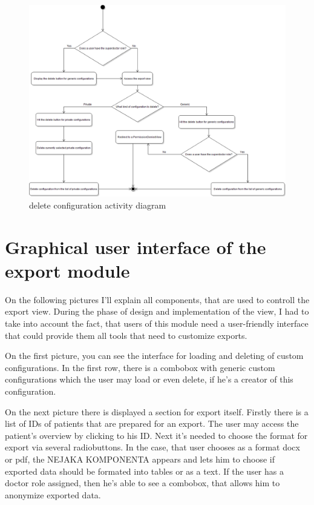 \documentclass[thesis=B,english]{FITthesis}[2012/10/20]
\begin{document}
\begin{figure}\centering
\includegraphics[width=0.7\paperwidth]{deleteConfigurationDiagram}
		\caption{delete configuration activity diagram}
\end{figure}



\section{Graphical user interface of the export module}
On the following pictures I'll explain all components, that are used to controll the export view. During the phase of design and implementation of the view, I had to take into account the fact, that users of this module need a user-friendly interface that could provide them all tools that need to customize exports.

On the first picture, you can see the interface for loading and deleting of custom configurations. In the first row, there is a combobox with generic custom configurations which the user may load or even delete, if he's a creator of this configuration.

On the next picture there is displayed a section for export itself. Firstly there is a list of IDs of patients that are prepared for an export. The user may access the patient's overview by clicking to his ID. Next it's needed to choose the format for export via several radiobuttons. In the case, that user chooses as a format docx or pdf, the NEJAKA KOMPONENTA appears and lets him to choose if exported data should be formated into tables or as a text. If the user has a doctor role assigned, then he's able to see a combobox, that allows him to anonymize exported data.
\end{document}
